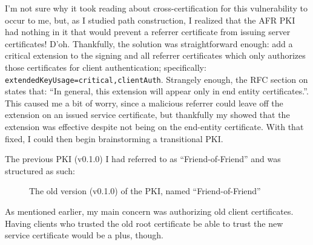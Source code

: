 \documentclass{article}
\begin{document}
I'm not sure why it took reading about cross-certification for this vulnerability to occur to me, but, as I studied path construction, I realized that the AFR PKI had nothing in it that would prevent a referrer certificate from issuing server certificates!  D'oh.  Thankfully, the solution was straightforward enough: add a critical extension to the signing and all referrer certificates which only authorizes those certificates for client authentication; specifically: \texttt{extendedKeyUsage=critical,clientAuth}.  Strangely enough, the RFC section on  states that: ``In general, this extension will appear only in end entity certificates.''.  This caused me a bit of worry, since a malicious referrer could leave off the extension on an issued service certificate, but thankfully my  showed that the extension was effective despite not being on the end-entity certificate.  With that fixed, I could then begin brainstorming a transitional PKI.

The previous PKI (v0.1.0) I had referred to as ``Friend-of-Friend'' and was structured as such:
\begin{center}
\begin{figure}
\begin{makeimage}
\end{makeimage}
\caption{The old version (v0.1.0) of the PKI, named ``Friend-of-Friend''}
\end{figure}
\end{center}
As mentioned earlier, my main concern was authorizing old client certificates.  Having clients who trusted the old root certificate be able to trust the new service certificate would be a plus, though.
\end{document}
